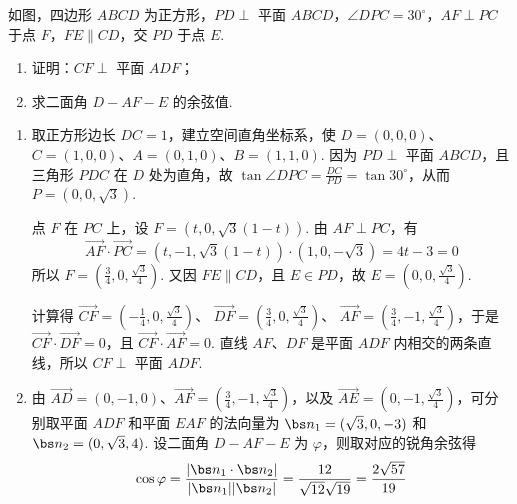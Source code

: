 \begin{problem}
如图，四边形 \(ABCD\) 为正方形，\(PD \perp\) 平面 \(ABCD\)，\(\angle DPC = 30^{\circ}\)，\(AF \perp PC\) 于点 \(F\)，\(FE \parallel CD\)，交 \(PD\) 于点 \(E\).

\begin{enumerate}
\item 证明：\(CF \perp\) 平面 \(ADF\)；
\item 求二面角 \(D - AF - E\) 的余弦值.
\end{enumerate}

\end{problem}

\begin{solution}
\begin{enumerate}
\item
取正方形边长 \(DC=1\)，建立空间直角坐标系，使
\(D=(0,0,0)\)、\(C=(1,0,0)\)、\(A=(0,1,0)\)、\(B=(1,1,0)\). 因为 \(PD\perp\) 平面 \(ABCD\)，且三角形 \(PDC\) 在 \(D\) 处为直角，故
\(\tan\angle DPC=\frac{DC}{PD}=\tan30^\circ\)，从而 \(P=(0,0,\sqrt3)\).

点 \(F\) 在 \(PC\) 上，设 \(F=(t,0,\sqrt3(1-t))\). 由 \(AF\perp PC\)，有
\[
\overrightarrow{AF}\cdot\overrightarrow{PC}
=\left(t,-1,\sqrt3(1-t)\right)\cdot(1,0,-\sqrt3)
=4t-3=0
\]
所以 \(F=\left(\frac34,0,\frac{\sqrt3}{4}\right)\). 又因 \(FE\parallel CD\)，且 \(E\in PD\)，故 \(E=\left(0,0,\frac{\sqrt3}{4}\right)\).

计算得
\(\overrightarrow{CF}=\left(-\frac14,0,\frac{\sqrt3}{4}\right)\)、
\(\overrightarrow{DF}=\left(\frac34,0,\frac{\sqrt3}{4}\right)\)、
\(\overrightarrow{AF}=\left(\frac34,-1,\frac{\sqrt3}{4}\right)\)，于是
\(\overrightarrow{CF}\cdot\overrightarrow{DF}=0\)，且 \(\overrightarrow{CF}\cdot\overrightarrow{AF}=0\). 直线 \(AF\)、\(DF\) 是平面 \(ADF\) 内相交的两条直线，所以 \(CF\perp\) 平面 \(ADF\).

\item 由 \(\overrightarrow{AD}=(0,-1,0)\)、\(\overrightarrow{AF}=\left(\frac34,-1,\frac{\sqrt3}{4}\right)\)，以及 \(\overrightarrow{AE}=\left(0,-1,\frac{\sqrt3}{4}\right)\)，可分别取平面 \(ADF\) 和平面 \(EAF\) 的法向量为
\(\bs n_1=(\sqrt3,0,-3)\) 和 \(\bs n_2=(0,\sqrt3,4)\). 设二面角 \(D-AF-E\) 为 \(\varphi\)，则取对应的锐角余弦得
\[
\cos\varphi=\frac{|\bs n_1\cdot\bs n_2|}{|\bs n_1||\bs n_2|}
=\frac{12}{\sqrt{12}\sqrt{19}}
=\frac{2\sqrt{57}}{19}
\]
\end{enumerate}
\end{solution}

